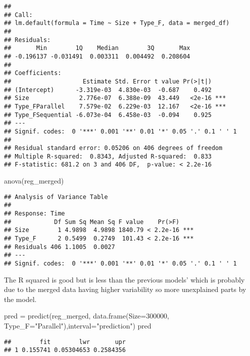\documentclass[
]{article}
\newenvironment{Shaded}{\begin{snugshade}}{\end{snugshade}}
\newcommand{\AttributeTok}[1]{\textcolor[rgb]{0.77,0.63,0.00}{#1}}
\newcommand{\DecValTok}[1]{\textcolor[rgb]{0.00,0.00,0.81}{#1}}
\newcommand{\FunctionTok}[1]{\textcolor[rgb]{0.00,0.00,0.00}{#1}}
\newcommand{\NormalTok}[1]{#1}
\newcommand{\OtherTok}[1]{\textcolor[rgb]{0.56,0.35,0.01}{#1}}
\newcommand{\StringTok}[1]{\textcolor[rgb]{0.31,0.60,0.02}{#1}}
\begin{document}
\begin{verbatim}
## 
## Call:
## lm.default(formula = Time ~ Size + Type_F, data = merged_df)
## 
## Residuals:
##       Min        1Q    Median        3Q       Max 
## -0.196137 -0.031491  0.003311  0.004492  0.208604 
## 
## Coefficients:
##                    Estimate Std. Error t value Pr(>|t|)    
## (Intercept)      -3.319e-03  4.830e-03  -0.687    0.492    
## Size              2.776e-07  6.388e-09  43.449   <2e-16 ***
## Type_FParallel    7.579e-02  6.229e-03  12.167   <2e-16 ***
## Type_FSequential -6.073e-04  6.458e-03  -0.094    0.925    
## ---
## Signif. codes:  0 '***' 0.001 '**' 0.01 '*' 0.05 '.' 0.1 ' ' 1
## 
## Residual standard error: 0.05206 on 406 degrees of freedom
## Multiple R-squared:  0.8343, Adjusted R-squared:  0.833 
## F-statistic: 681.2 on 3 and 406 DF,  p-value: < 2.2e-16
\end{verbatim}

\begin{Shaded}
\begin{Highlighting}[]
\FunctionTok{anova}\NormalTok{(reg\_merged)}
\end{Highlighting}
\end{Shaded}

\begin{verbatim}
## Analysis of Variance Table
## 
## Response: Time
##            Df Sum Sq Mean Sq F value    Pr(>F)    
## Size        1 4.9898  4.9898 1840.79 < 2.2e-16 ***
## Type_F      2 0.5499  0.2749  101.43 < 2.2e-16 ***
## Residuals 406 1.1005  0.0027                      
## ---
## Signif. codes:  0 '***' 0.001 '**' 0.01 '*' 0.05 '.' 0.1 ' ' 1
\end{verbatim}

The R squared is good but is less than the previous models' which is
probably due to the merged data having higher variability so more
unexplained parts by the model.

\begin{Shaded}
\begin{Highlighting}[]
\NormalTok{pred }\OtherTok{=} \FunctionTok{predict}\NormalTok{(reg\_merged, }\FunctionTok{data.frame}\NormalTok{(}\AttributeTok{Size=}\DecValTok{300000}\NormalTok{, }\AttributeTok{Type\_F=}\StringTok{"Parallel"}\NormalTok{),}\AttributeTok{interval=}\StringTok{"prediction"}\NormalTok{)}
\NormalTok{pred}
\end{Highlighting}
\end{Shaded}

\begin{verbatim}
##        fit        lwr       upr
## 1 0.155741 0.05304653 0.2584356
\end{verbatim}
\end{document}
